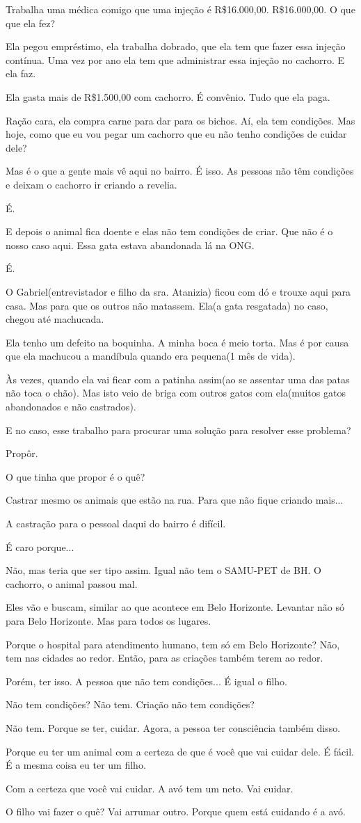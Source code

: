 \documentclass[12pt,a4paper]{article}
\newenvironment{turnos}{\begin{list}{}{\setlength{\leftmargin}{2.2cm}\setlength{\labelwidth}{2.0cm}\setlength{\labelsep}{0.2cm}\setlength{\itemsep}{0.45em}\setlength{\parsep}{0pt}}}{\end{list}}
\newcommand{\fala}[1]{\item[\textbf{#1}\hfill]}
\begin{document}
\begin{turnos}
\fala{G:} Trabalha uma médica comigo que uma injeção é R\$16.000,00. R\$16.000,00. O que que ela fez?
\fala{G:} Ela pegou empréstimo, ela trabalha dobrado, que ela tem que fazer essa injeção contínua. Uma vez por ano ela tem que administrar essa injeção no cachorro. E ela faz.
\fala{G:} Ela gasta mais de R\$1.500,00 com cachorro. É convênio. Tudo que ela paga.
\fala{G:} Ração cara, ela compra carne para dar para os bichos. Aí, ela tem condições. Mas hoje, como que eu vou pegar um cachorro que eu não tenho condições de cuidar dele?
\fala{A:} Mas é o que a gente mais vê aqui no bairro. É isso. As pessoas não têm condições e deixam o cachorro ir criando a revelia.
\fala{G:} É.
\fala{A:} E depois o animal fica doente e elas não tem condições de criar. Que não é o nosso caso aqui. Essa gata estava abandonada lá na ONG.
\fala{E:} É.
\fala{A:} O Gabriel(entrevistador e filho da sra. Atanizia) ficou com dó e trouxe aqui para casa. Mas para que os outros não matassem. Ela(a gata resgatada) no caso, chegou até machucada.
\fala{E:} Ela tenho um defeito na boquinha. A minha boca é meio torta. Mas é por causa que ela machucou a mandíbula quando era pequena(1 mês de vida).
\fala{E:} Às vezes, quando ela vai ficar com a patinha assim(ao se assentar uma das patas não toca o chão). Mas isto veio de briga com outros gatos com ela(muitos gatos abandonados e não castrados).
\fala{G:} E no caso, esse trabalho para procurar uma solução para resolver esse problema? 
\fala{E:} Propôr. 
\fala{G:} O que tinha que propor é o quê?
\fala{G:} Castrar mesmo os animais que estão na rua. Para que não fique criando mais... 
\fala{A:} A castração para o pessoal daqui do bairro é difícil.
\fala{E:} É caro porque...
\fala{G:} Não, mas teria que ser tipo assim. Igual não tem o SAMU-PET de BH. O cachorro, o animal passou mal.
\fala{G:} Eles vão e buscam, similar ao que acontece em Belo Horizonte. Levantar não só para Belo Horizonte. Mas para todos os lugares.
\fala{G:} Porque o hospital para atendimento humano, tem só em Belo Horizonte? Não, tem nas cidades ao redor. Então, para as criações também terem ao redor.
\fala{G:} Porém, ter isso. A pessoa que não tem condições... É igual o filho.
\fala{G:} Não tem condições? Não tem. Criação não tem condições?
\fala{G:} Não tem. Porque se ter, cuidar. Agora, a pessoa ter consciência também disso.
\fala{G:} Porque eu ter um animal com a certeza de que é você que vai cuidar dele. É fácil. É a mesma coisa eu ter um filho.
\fala{G:} Com a certeza que você vai cuidar. A avó tem um neto. Vai cuidar.
\fala{G:} O filho vai fazer o quê? Vai arrumar outro. Porque quem está cuidando é a avó.

\end{turnos}
\end{document}
